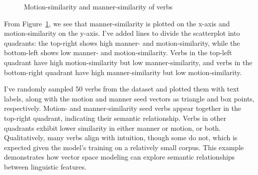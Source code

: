 \documentclass[
  letterpaper,
  krantz1]{latex/krantz-mod}
\theoremstyle{definition}
\theoremstyle{definition}
\theoremstyle{remark}
\begin{document}
\begin{figure}[!htb]


\caption{\label{fig-explore-masc-vsm-word2vec-manner-motion-compare}Motion-similarity
and manner-similarity of verbs}

\end{figure}%

From Figure~\ref{fig-explore-masc-vsm-word2vec-manner-motion-compare},
we see that manner-similarity is plotted on the x-axis and
motion-similarity on the y-axis. I've added lines to divide the
scatterplot into quadrants: the top-right shows high manner- and
motion-similarity, while the bottom-left shows low manner- and
motion-similarity. Verbs in the top-left quadrant have high
motion-similarity but low manner-similarity, and verbs in the
bottom-right quadrant have high manner-similarity but low
motion-similarity.

I've randomly sampled 50 verbs from the dataset and plotted them with
text labels, along with the motion and manner seed vectors as triangle
and box points, respectively. Motion- and manner-similarity seed verbs
appear together in the top-right quadrant, indicating their semantic
relationship. Verbs in other quadrants exhibit lower similarity in
either manner or motion, or both. Qualitatively, many verbs align with
intuition, though some do not, which is expected given the model's
training on a relatively small corpus. This
example demonstrates how vector space modeling can explore semantic
relationships between linguistic features.
\end{document}
